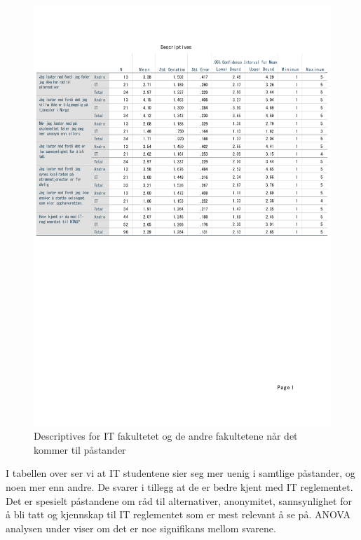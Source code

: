 \begin{figure}[H]
    \centering
    \includegraphics[scale=0.6]{case_1/bilder/fakultet_pastander_descriptive.pdf}
    \caption[Descriptives av fakultetene på påstander]{Descriptives for IT fakultetet og de andre fakultetene når det kommer til påstander}
    \label{fig:fakultet_pastander_descriptive}
\end{figure}

I tabellen over ser vi at IT studentene sier seg mer uenig i samtlige påstander, og noen mer enn andre. De svarer i tillegg at de er bedre kjent med IT reglementet. Det er spesielt påstandene om råd til alternativer, anonymitet, sannsynlighet for å bli tatt og kjennskap til IT reglementet som er mest relevant å se på. ANOVA analysen under viser om det er noe signifikans mellom svarene. 

